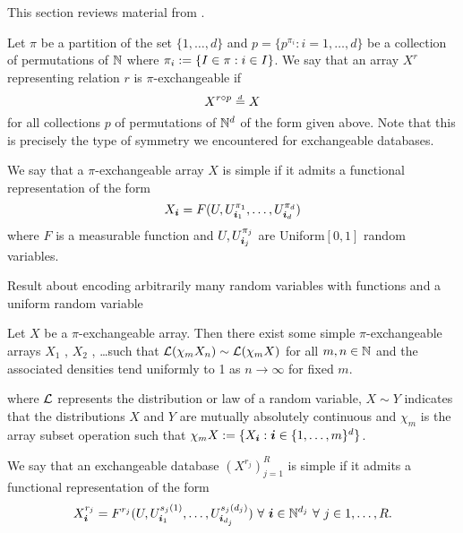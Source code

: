 This section reviews material from .

Let $\pi$ be a partition of the set $\{1,\dots,d\}$ and $p = \{p^{\pi_i} : i = 1,\dots,d\}$ be a collection of permutations of $\mathbb{N}$ where $\pi_i := \{I \in \pi : i \in I\}$.
We say that an array $X^r$ representing relation $r$ is $\pi$-exchangeable if 
\begin{equation}
  X^{r\circ p} \overset{\,_{\!d}}{=} X
\end{equation}
for all collections $p$ of permutations of $\mathbb{N}^d$ of the form given above.
Note that this is precisely the type of symmetry we encountered for exchangeable databases.

We say that a $\pi$-exchangeable array $X$ is simple if it admits a functional representation of the form
\begin{equation}
  X_{\bm{i}} = F(U, U^{\pi_1}_{\bm{i}_1}, \dots, U^{\pi_d}_{\bm{i}_d})
\end{equation}
where $F$ is a measurable function and $U, U^{\pi_j}_{\bm{i}_j}$ are \iid Uniform$[0,1]$ random variables.

\begin{prop}
  \label{prop:hypercube}
  Result about encoding arbitrarily many random variables with functions and a uniform random variable
\end{prop}

\begin{thm}
  \label{thm:piex}
  Let $X$ be a $\pi$-exchangeable array.
  Then there exist some simple $\pi$-exchangeable arrays $X_1$ , $X_2$ , \dots such that
  $\mathcal{L}(\chi_m X_n) \sim \mathcal{L}(\chi_m X)$ for all $m,n \in \mathbb{N}$ and the associated densities tend
  uniformly to 1 as $n \to \infty$ for fixed $m$.
\end{thm}

where $\mathcal{L}$ represents the distribution or law of a random variable, $X \sim Y$ indicates that the distributions $X$ and $Y$ are mutually absolutely continuous and $\chi_m$ is the array subset operation such that $\chi_m X := \{X_{\bm{i}} : \bm{i} \in \{1,\dots,m\}^d\}$.

We say that an exchangeable database $(X^{r_j})_{j=1}^R$ is simple if it admits a functional representation of the form
\begin{equation}
  X^{r_j}_{\bm{i}} = F^{r_j}(U, U^{s_{j}(1)}_{\bm{i}_1},\dots,U^{s_{j}(d_j)}_{\bm{i}_{d_j}}) \,\, \forall \,\, \bm{i} \in \mathbb{N}^{d_j} \,\, \forall \,\, j \in {1,\dots,R}.
\end{equation}

